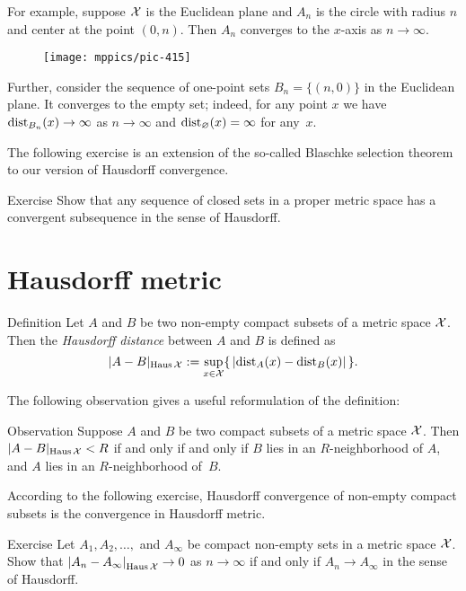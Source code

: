 For example, suppose $\mathcal{X}$ is the Euclidean plane and $A_n$ is the circle with radius $n$ and center at the point $(0,n)$.
Then $A_n$ converges to the $x$-axis as $n\to \infty$.

\begin{figure}[ht!]
\vskip-0mm
\centering
\texttt{[image: mppics/pic-415]}
\end{figure}

Further, consider the sequence of one-point sets $B_n=\{(n,0)\}$ in the Euclidean plane.
It converges to the empty set;
indeed, for any point $x$ we have $\mathrm{dist}_{B_n}(x)\to\infty$ as $n\to \infty$ and $\mathrm{dist}_{\varnothing}(x)= \infty$ for any~$x$.

The following exercise is an extension of the so-called Blaschke selection theorem to our version of Hausdorff convergence.

\begin{thm}{Exercise}\label{ex:generalized-selection}
Show that any sequence of closed sets in a proper metric space has a convergent subsequence in the sense of Hausdorff.
\end{thm}

\section{Hausdorff metric}

\begin{thm}{Definition}\label{def:hausdorff-convergence}
Let $A$ and $B$ be two non-empty compact subsets of a metric space $\mathcal{X}$.
Then the \emph{Hausdorff distance} between $A$ and $B$ is defined as 
$$|A-B|_{\operatorname{\rm Haus}\nolimits\mathcal{X}}
\mathrel{:=}
\sup_{x\in \mathcal{X}}\{\,|\mathrm{dist}_A(x)-\mathrm{dist}_B(x)|\,\}.
$$

\end{thm}

The following observation gives a useful reformulation of the definition:

\begin{thm}{Observation}\label{obs:Haus-nbhds}
Suppose $A$ and $B$ be two compact subsets of a metric space $\mathcal{X}$.
Then $|A-B|_{\operatorname{\rm Haus}\nolimits\mathcal{X}}< R$ if and only if and only if 
$B$ lies in an $R$-neighborhood of $A$, 
and 
$A$ lies in an $R$-neighborhood of~$B$.
\end{thm}

According to the following exercise, Hausdorff convergence of non-empty compact subsets is the convergence in Hausdorff metric.

\begin{thm}{Exercise}\label{ex:Haus-conv}
Let $A_1,A_2,\dots,$ and $A_\infty$ be compact non-empty sets in a metric space $\mathcal{X}$.
Show that $|{A_n}-{A_\infty}|_{\operatorname{\rm Haus}\nolimits\mathcal{X}}^{{}}\to 0$ as $n\to\infty$
if and only if $A_n\to A_\infty$ in the sense of Hausdorff.
\end{thm}

